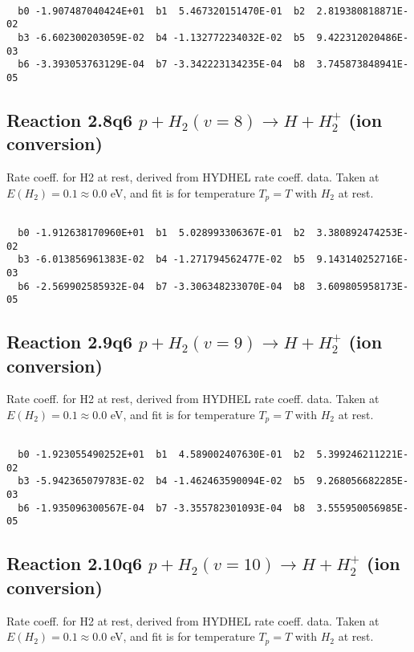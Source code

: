 \documentclass[12pt,dvipdfmx]{article}
\begin{document}
\begin{small}\begin{verbatim}

  b0 -1.907487040424E+01  b1  5.467320151470E-01  b2  2.819380818871E-02
  b3 -6.602300203059E-02  b4 -1.132772234032E-02  b5  9.422312020486E-03
  b6 -3.393053763129E-04  b7 -3.342223134235E-04  b8  3.745873848941E-05

\end{verbatim}\end{small}

\newpage
\subsection{
Reaction 2.8q6
$ p + H_2(v=8) \rightarrow H + H_2^+$ (ion conversion)
}
Rate coeff. for H2 at rest, derived from HYDHEL rate coeff. data.
Taken at $E(H_2) = 0.1 \approx 0.0$ eV,  and fit is for temperature $T_p=T$ with $H_2$ at rest.

\begin{small}\begin{verbatim}

  b0 -1.912638170960E+01  b1  5.028993306367E-01  b2  3.380892474253E-02
  b3 -6.013856961383E-02  b4 -1.271794562477E-02  b5  9.143140252716E-03
  b6 -2.569902585932E-04  b7 -3.306348233070E-04  b8  3.609805958173E-05

\end{verbatim}\end{small}

\newpage
\subsection{
Reaction 2.9q6
$ p + H_2(v=9) \rightarrow H + H_2^+$ (ion conversion)
}
Rate coeff. for H2 at rest, derived from HYDHEL rate coeff. data.
Taken at $E(H_2) = 0.1 \approx 0.0$ eV,  and fit is for temperature $T_p=T$ with $H_2$ at rest.

\begin{small}\begin{verbatim}

  b0 -1.923055490252E+01  b1  4.589002407630E-01  b2  5.399246211221E-02
  b3 -5.942365079783E-02  b4 -1.462463590094E-02  b5  9.268056682285E-03
  b6 -1.935096300567E-04  b7 -3.355782301093E-04  b8  3.555950056985E-05

\end{verbatim}\end{small}

\newpage
\subsection{
Reaction 2.10q6
$ p + H_2(v=10) \rightarrow H + H_2^+$ (ion conversion)
}
Rate coeff. for H2 at rest, derived from HYDHEL rate coeff. data.
Taken at $E(H_2) = 0.1 \approx 0.0$ eV,  and fit is for temperature $T_p=T$ with $H_2$ at rest.
\end{document}

